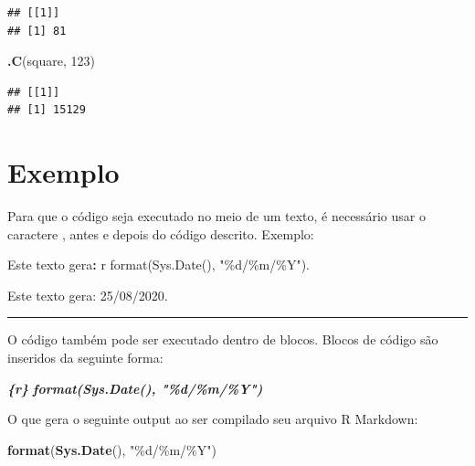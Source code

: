 \documentclass[
]{book}
\newenvironment{Shaded}{\begin{snugshade}}{\end{snugshade}}
\newcommand{\DataTypeTok}[1]{\textcolor[rgb]{0.13,0.29,0.53}{#1}}
\newcommand{\DecValTok}[1]{\textcolor[rgb]{0.00,0.00,0.81}{#1}}
\newcommand{\InformationTok}[1]{\textcolor[rgb]{0.56,0.35,0.01}{\textbf{\textit{#1}}}}
\newcommand{\KeywordTok}[1]{\textcolor[rgb]{0.13,0.29,0.53}{\textbf{#1}}}
\newcommand{\NormalTok}[1]{#1}
\newcommand{\OperatorTok}[1]{\textcolor[rgb]{0.81,0.36,0.00}{\textbf{#1}}}
\newcommand{\StringTok}[1]{\textcolor[rgb]{0.31,0.60,0.02}{#1}}
\begin{document}
\begin{verbatim}
## [[1]]
## [1] 81
\end{verbatim}

\begin{Shaded}
\begin{Highlighting}[]
\KeywordTok{.C}\NormalTok{(}\StringTok{\textquotesingle{}square\textquotesingle{}}\NormalTok{, }\DecValTok{123}\NormalTok{)}
\end{Highlighting}
\end{Shaded}

\begin{verbatim}
## [[1]]
## [1] 15129
\end{verbatim}

\hypertarget{exemplo}{%
\section{Exemplo}\label{exemplo}}

Para que o código seja executado no meio de um texto, é necessário usar o caractere \texttt{\textasciigrave{}}, antes e depois do código descrito. Exemplo:

\begin{Shaded}
\begin{Highlighting}[]
\NormalTok{Este texto gera}\OperatorTok{:}\StringTok{ \textasciigrave{}}\DataTypeTok{r format(Sys.Date(), "\%d/\%m/\%Y")}\StringTok{\textasciigrave{}}\NormalTok{.}
\end{Highlighting}
\end{Shaded}

Este texto gera: 25/08/2020.

\begin{center}\rule{0.5\linewidth}{0.5pt}\end{center}

O código também pode ser executado dentro de blocos. Blocos de código são inseridos da seguinte forma:

\begin{Shaded}
\begin{Highlighting}[]
\InformationTok{\textasciigrave{}\textasciigrave{}\textasciigrave{}\{r\}}
\InformationTok{format(Sys.Date(), "\%d/\%m/\%Y")}
\InformationTok{\textasciigrave{}\textasciigrave{}\textasciigrave{}}
\end{Highlighting}
\end{Shaded}

O que gera o seguinte output ao ser compilado seu arquivo R Markdown:

\begin{Shaded}
\begin{Highlighting}[]
\KeywordTok{format}\NormalTok{(}\KeywordTok{Sys.Date}\NormalTok{(), }\StringTok{"\%d/\%m/\%Y"}\NormalTok{)}
\end{Highlighting}
\end{Shaded}
\end{document}
